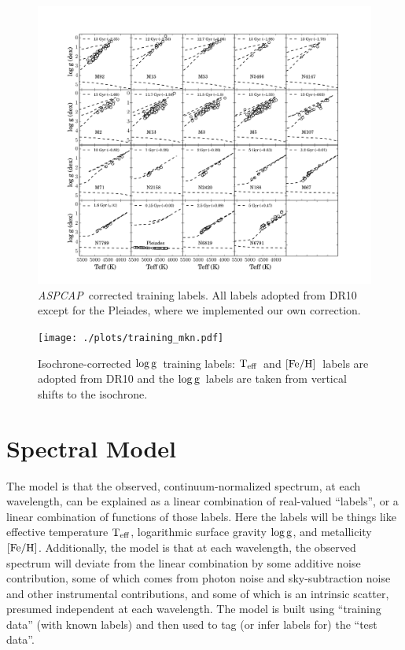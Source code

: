 \documentclass[12pt, preprint]{aastex}
\newcommand{\teff}{\mbox{$\rm T_{eff}$}}
\newcommand{\feh}{\mbox{$\rm [Fe/H]$}}
\newcommand{\logg}{\mbox{$\rm \log g$}}
\newcommand{\aspcap}{\textsl{ASPCAP}}
\begin{document}
\begin{figure}[h!]
\centering
    \includegraphics[scale=0.4]{./plots/training_aspcap.pdf}
\caption{\aspcap\ corrected training labels. All labels adopted from DR10 except for the Pleiades, where we implemented our own correction. }
\label{fig:trainingaspcap}
\end{figure}

\begin{figure}[h!]
\centering
  \texttt{[image: ./plots/training\_mkn.pdf]}
\caption{Isochrone-corrected \logg\ training labels: \teff\ and \feh\ labels are adopted from DR10 and the \logg\ labels are taken from vertical shifts to the isochrone. }
\label{fig:trainingisochrone}
\end{figure}


\section{Spectral Model}
\label{sec:spectralmodel}

The model is that the observed, continuum-normalized spectrum, at each
wavelength, can be explained as a linear combination of real-valued
``labels'', or a linear combination of functions of those labels.
Here the labels will be things like effective temperature $\teff$,
logarithmic surface gravity $\logg$, and metallicity $\feh$.
Additionally, the model is that at each wavelength, the observed
spectrum will deviate from the linear combination by some additive
noise contribution, some of which comes from photon noise and
sky-subtraction noise and other instrumental contributions, and some
of which is an intrinsic scatter, presumed independent at each
wavelength.
The model is built using ``training data'' (with known labels) and then
used to tag (or infer labels for) the ``test data''.
\end{document}
